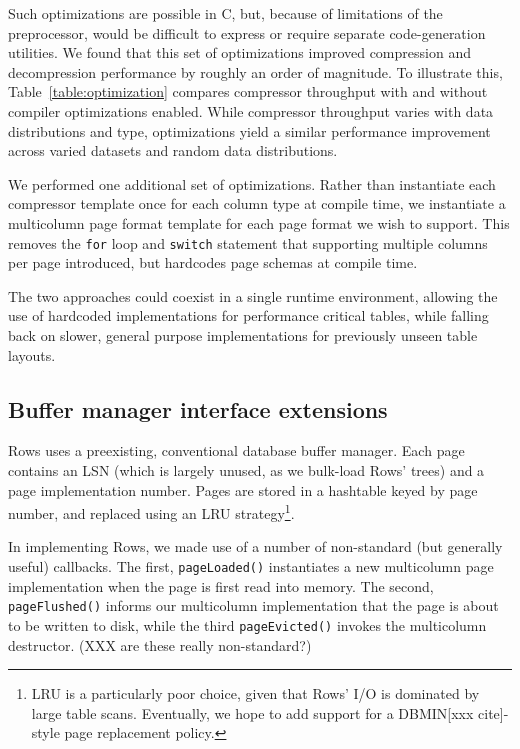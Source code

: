 \documentclass{sig-alternate-sigmod08}
\newcommand{\rows}{Rows\xspace}
\newcommand{\rowss}{Rows'\xspace}
\begin{document}
Such optimizations are possible in C, but, because of limitations of
the preprocessor, would be difficult to express or require separate
code-generation utilities.  We found that this set of optimizations
improved compression and decompression performance by roughly an order
of magnitude.  To illustrate this, Table~\ref{table:optimization}
compares compressor throughput with and without compiler optimizations
enabled.  While compressor throughput varies with data distributions
and type, optimizations yield a similar performance improvement across
varied datasets and random data distributions.

We performed one additional set of optimizations.  Rather than
instantiate each compressor template once for each column type at
compile time, we instantiate a multicolumn page format template for
each page format we wish to support.  This removes the {\tt for} loop
and {\tt switch} statement that supporting multiple columns per page
introduced, but hardcodes page schemas at compile time.

The two approaches could coexist in a single runtime environment,
allowing the use of hardcoded implementations for performance critical
tables, while falling back on slower, general purpose implementations
for previously unseen table layouts.

\subsection{Buffer manager interface extensions}

\rows uses a preexisting, conventional database buffer manager.  Each
page contains an LSN (which is largely unused, as we bulk-load \rowss
trees) and a page implementation number.  Pages are stored in a
hashtable keyed by page number, and replaced using an LRU
strategy\footnote{LRU is a particularly poor choice, given that \rowss
  I/O is dominated by large table scans.  Eventually, we hope to add
  support for a DBMIN[xxx cite]-style page replacement policy.}.

In implementing \rows, we made use of a number of non-standard (but
generally useful) callbacks.  The first, {\tt pageLoaded()}
instantiates a new multicolumn page implementation when the page is
first read into memory.  The second, {\tt pageFlushed()} informs our
multicolumn implementation that the page is about to be written to
disk, while the third {\tt pageEvicted()} invokes the multicolumn
destructor.  (XXX are these really non-standard?)
\end{document}
